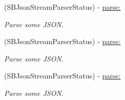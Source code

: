 \begin{DoxyCompactItemize}
(\-S\-B\-Json\-Stream\-Parser\-Status) -\/ \hyperlink{interface_s_b_json_stream_parser_a9c4b15221e738a1eb49079e266daa1bf}{parse\-:}
\begin{DoxyCompactList}\small\item\em \-Parse some \-J\-S\-O\-N. \end{DoxyCompactList}\item 
(\-S\-B\-Json\-Stream\-Parser\-Status) -\/ \hyperlink{interface_s_b_json_stream_parser_a9c4b15221e738a1eb49079e266daa1bf}{parse\-:}
\begin{DoxyCompactList}\small\item\em \-Parse some \-J\-S\-O\-N. \end{DoxyCompactList}\item 
(\-S\-B\-Json\-Stream\-Parser\-Status) -\/ \hyperlink{interface_s_b_json_stream_parser_a9c4b15221e738a1eb49079e266daa1bf}{parse\-:}
\begin{DoxyCompactList}\small\item\em \-Parse some \-J\-S\-O\-N. \end{DoxyCompactList}\end{DoxyCompactItemize}

